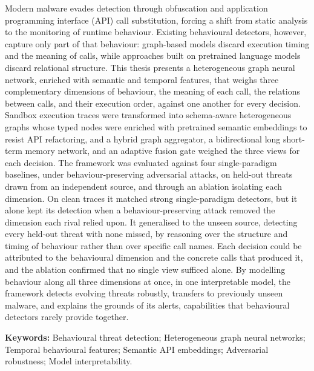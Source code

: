 \documentclass[%
    BCOR=10mm,
    DIV=13,
    toc=bibliography,
    toc=listof,
    oneside,
    12pt,
]{scrbook}
\let\cleardoublepage\clearpage
\begin{document}
\noindent
Modern malware evades detection through obfuscation and application programming
interface (API) call substitution, forcing a shift from static analysis to the
monitoring of runtime behaviour. Existing behavioural detectors, however,
capture only part of that behaviour: graph-based models discard execution timing
and the meaning of calls, while approaches built on pretrained language models
discard relational structure. This thesis presents a heterogeneous graph
neural network, enriched with semantic and temporal features, that weighs three
complementary dimensions of behaviour, the meaning of each call, the relations
between calls, and their execution order, against one another for every decision. Sandbox execution traces were transformed into schema-aware
heterogeneous graphs whose typed nodes were enriched with pretrained semantic
embeddings to resist API refactoring, and a hybrid graph aggregator, a
bidirectional long short-term memory network, and an adaptive fusion gate
weighed the three views for each decision. The framework was evaluated against
four single-paradigm baselines, under behaviour-preserving adversarial attacks,
on held-out threats drawn from an independent source, and through an ablation
isolating each dimension.
On clean traces it matched strong single-paradigm detectors, but it alone kept its
detection when a behaviour-preserving attack removed the dimension each rival relied
upon. It generalised to the unseen source, detecting every held-out threat with
none missed, by reasoning over the structure and timing of behaviour rather than
over specific call names. Each decision could be attributed to the behavioural
dimension and the concrete calls that produced it, and the ablation confirmed that
no single view sufficed alone. By modelling behaviour along all three
dimensions at once, in one interpretable model, the framework detects evolving
threats robustly, transfers to previously unseen malware, and explains the grounds
of its alerts, capabilities that behavioural detectors rarely provide together.

\vspace{1em}
\noindent\textbf{Keywords:} Behavioural threat detection; Heterogeneous graph neural
networks; Temporal behavioural features; Semantic API embeddings; Adversarial robustness;
Model interpretability.

\begingroup
{}
\tableofcontents
\endgroup
\begingroup
{}
\listoffigures
\medskip
\begingroup\let\clearpage\relax\let\cleardoublepage\relax
\listoftables
\endgroup
\endgroup
\newpage
\end{document}
